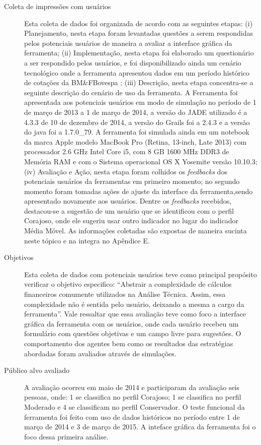 \begin{description}
\item[Coleta de impressões com usuários]
Esta coleta de dados foi organizada de acordo com as seguintes etapas: (i) Planejamento, nesta etapa foram levantadas questões a serem respondidas pelos potenciais usuários de maneira a avaliar a interface gráfica da ferramenta; (ii) Implementação, nesta etapa foi elaborado um questionário a ser respondido pelos usuários, e foi disponibilizado ainda um cenário tecnológico onde a ferramenta apresentou dados em um período histórico de cotações da BM\&FBovespa ; (iii) Descrição, nesta etapa concentra-se a seguinte descrição do cenário de uso da ferramenta. A Ferramenta foi apresentada aos potenciais usuários em modo de simulação no período de 1 de março de 2013 a 1 de março de 2014, a versão do JADE utilizado é a 4.3.3 de 10 de dezembro de 2014, a versão do Grails foi a 2.4.3 e a versão do java foi a 1.7.0\_79. A ferramenta foi simulada ainda em um notebook da marca Apple modelo MacBook Pro (Retina, 13-inch, Late 2013) com processador 2.6 GHz Intel Core i5, com 8 GB 1600 MHz DDR3 de Memória RAM e com o Sistema operacional OS X Yosemite versão 10.10.3; (iv) Avaliação e Ação, nesta etapa foram colhidos os \textit{feedbacks} dos potenciais usuários da ferramentas em primeiro momento; no segundo momento foram tomadas ações de ajuste da interface da ferramenta,sendo apresentado novamente aos usuários. Dentre os \textit{feedbacks} recebidos, destacou-se a sugestão de um usuário que se identificou com o perfil Corajoso, onde ele sugeriu usar outro indicador no lugar do indicador Média Móvel. As informações coletadas são expostas de maneira sucinta neste tópico e na integra no Apêndice E.

\item[Objetivos]
Esta coleta de dados com potenciais usuários teve como principal propósito verificar o objetivo especifico: “Abstrair a complexidade de cálculos financeiros comumente utilizados na Análise Técnica. Assim, essa complexidade não é sentida pelo usuário, deixando a mesma a cargo da ferramenta”. Vale ressaltar que essa avaliação teve como foco a interface gráfica da ferramenta com os usuários, onde cada usuário recebeu um formulário com questões objetivas e um campo livre para sugestões. O comportamento dos agentes bem como os resultados das estratégias abordadas foram avaliados através de simulações.

\item[Público alvo avaliado]

A avaliação ocorreu em maio de 2014 e participaram da avaliação seis pessoas, onde: 1 se classifica no perfil Corajoso; 1 se classifica no perfil Moderado e 4 se classificam no perfil Conservador. O teste funcional da ferramenta foi feito com uso de dados históricos no período entre 1 de março de 2014 e 3 de março de 2015. A inteface gráfica da ferramenta foi o foco dessa primeira análise.


\end{description}
